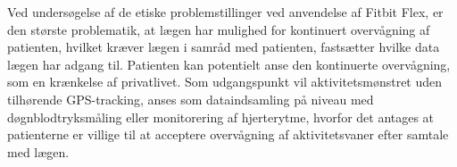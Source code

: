 Ved undersøgelse af de etiske problemstillinger ved anvendelse af Fitbit Flex, er den største problematik, at lægen har mulighed for kontinuert overvågning af patienten, hvilket kræver lægen i samråd med patienten, fastsætter hvilke data lægen har adgang til. Patienten kan potentielt anse den kontinuerte overvågning, som en krænkelse af privatlivet. Som udgangspunkt vil aktivitetsmønstret uden tilhørende GPS-tracking, anses som dataindsamling på niveau med døgnblodtryksmåling eller monitorering af hjerterytme, hvorfor det antages at patienterne er villige til at acceptere overvågning af aktivitetsvaner efter samtale med lægen. 
